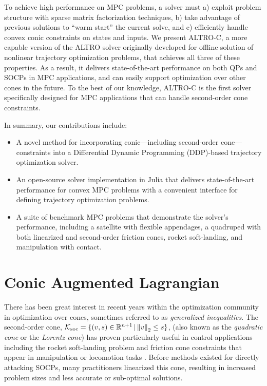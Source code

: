 \documentclass[../root.tex]{subfiles}
\begin{document}
    To achieve high performance on MPC problems, a solver must a) exploit
    problem structure with sparse matrix factorization techniques, b) take
    advantage of previous solutions to ``warm start'' the current solve, and
    c) efficiently handle convex conic constraints on states and inputs. We
    present ALTRO-C, a more capable version of the ALTRO solver
    \cite{howell_ALTRO_2019} originally developed for offline solution of nonlinear
    trajectory optimization problems, that achieves all three of these
    properties. As a result, it delivers state-of-the-art performance on both
    QPs and SOCPs in MPC applications, and can easily support optimization
    over other cones in the future. To the best of our knowledge, ALTRO-C is
    the first solver specifically designed for MPC applications that can
    handle second-order cone constraints.

    In summary, our contributions include:
    \begin{itemize}
        \item A novel method for incorporating conic---including second-order
        cone---constraints into a Differential Dynamic Programming
        (DDP)-based trajectory optimization solver.
        \item An open-source solver implementation in Julia that delivers
        state-of-the-art performance for convex MPC problems with a
        convenient interface for defining trajectory optimization problems.
        \item A suite of benchmark MPC problems that demonstrate the solver's
        performance, including a satellite with flexible appendages, a
        quadruped with both linearized and second-order friction cones,
        rocket soft-landing, and manipulation with contact.
    \end{itemize}

    \section{Conic Augmented Lagrangian} \label{sec:conic-al}

    There has been great interest in recent years within the optimization
    community in optimization over cones, sometimes referred to as
    \textit{generalized inequalities}. The second-order cone,
    $\mathcal{K}_\text{soc} = \{(v,s) \in \mathbb{R}^{n+1} \,|\, \norm{v}_2 \leq
    s\}$, 
    (also known as the \textit{quadratic cone} or the \textit{Lorentz
    cone}) has proven particularly useful in control applications including
    the rocket soft-landing problem \cite{acikmese_Convex_2007}
    \cite{acikmese_Lossless_2013} and friction cone constraints that appear
    in manipulation or locomotion tasks \cite{lobo_Applications_1998}. Before methods
    existed for directly attacking SOCPs, many practitioners linearized this
    cone, resulting in increased problem sizes and less accurate or
    sub-optimal solutions.
    
\end{document}
